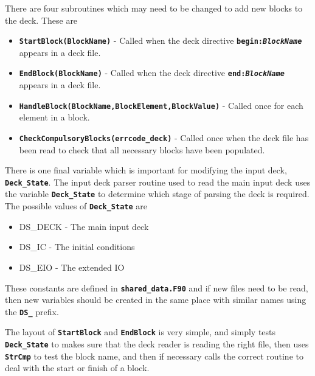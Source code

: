 \documentclass[12pt]{article}
\newcommand{\inlinecode}[1]{{\color{warwickred} \bf\texttt{#1}}}
\begin{document}
There are four subroutines which may need to be changed to add new blocks to
the deck. These are
\begin{itemize}
\item \inlinecode{StartBlock(BlockName)} - Called when the deck directive
  \inlinecode{begin:{\it BlockName}} appears in a deck file.
\item \inlinecode{EndBlock(BlockName)} - Called when the deck directive
  \inlinecode{end:{\it BlockName}} appears in a deck file.
\item \inlinecode{HandleBlock(BlockName,BlockElement,BlockValue)} - Called once
  for each element in a block.
\item \inlinecode{CheckCompulsoryBlocks(errcode\_deck)} - Called once when the
  deck file has been read to check that all necessary blocks have been
  populated.
\end{itemize}

There is one final variable which is important for modifying the input deck,
\inlinecode{Deck\_State}. The input deck parser routine used to read the main
input deck uses the variable \inlinecode{Deck\_State} to
determine which stage of parsing the deck is required. The possible values of
\inlinecode{Deck\_State} are

\begin{itemize}
\item DS\_DECK - The main input deck
\item DS\_IC - The initial conditions
\item DS\_EIO - The extended IO
\end{itemize}
These constants are defined in \inlinecode{shared\_data.F90} and if new files
need to be read, then new variables should be created in the same place with
similar names using the \inlinecode{DS\_} prefix.

The layout of \inlinecode{StartBlock} and \inlinecode{EndBlock} is very simple,
and simply tests \inlinecode{Deck\_State} to makes sure that the deck reader is
reading the right file, then uses \inlinecode{StrCmp} to test the block name,
and then if necessary calls the correct routine to deal with the start or
finish of a block.
\end{document}
